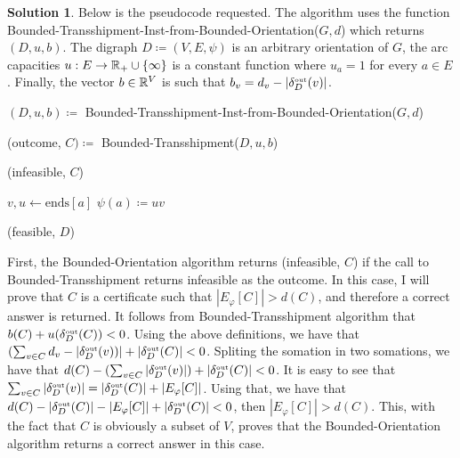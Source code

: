 \documentclass[11pt,leqno,final]{amsart}
\theoremstyle{definition}
\newtheorem{solution}{Solution}
\begin{document}
\begin{solution}
Below is the pseudocode requested. The algorithm uses the function Bounded-Transshipment-Inst-from-Bounded-Orientation($G,d$) which returns $(D, u, b)$. The digraph $D \coloneqq (V, E, \psi)$ is an arbitrary orientation of $G$, the arc capacities $u: E \to \Reals_{+} \cup \{\infty\}$ is a constant function where $u_a = 1$ for every $a \in E$. Finally, the vector $b \in \Reals^{V}$ is such that $b_v = d_v - |\deltaout[D](v)|$. 

\begin{algorithm}
  \caption{Bounded-Orientation($G$, $d$)}\label{bound}
  \begin{algorithmic}

    \State $(D, u, b) \coloneqq$ Bounded-Transshipment-Inst-from-Bounded-Orientation($G,d$)

    \State (outcome, $C) \coloneqq$ Bounded-Transshipment($D, u, b$)

              
      \State \Return (infeasible, $C$)  
    
    \EndIf 
    
      
        \State $v,u \gets \text{ends}[a]$        
        \State $\psi(a) \coloneqq uv$
      \EndIf 

    \EndFor
    \State \Return (feasible, $D$)
      
  \end{algorithmic}
\end{algorithm}

First, the Bounded-Orientation algorithm returns (infeasible, $C$) if the call to Bounded-Transshipment returns infeasible as the outcome. In this case, I will prove that $C$ is a certificate such that $|E_{\varphi} [C]| > d(C)$, and therefore a correct answer is returned. It follows from Bounded-Transshipment algorithm that $b(C) + u(\deltaout[D](C)) < 0$. Using the above definitions, we have that $(\sum_{v \in C} d_v - |\deltaout[D](v))| + |\deltaout[D](C)| < 0$. Spliting the somation in two somations, we have that  $d(C) - (\sum_{v \in C} |\deltaout[D](v)|) + |\deltaout[D](C)| < 0$. It is easy to see that $\sum_{v \in C} |\deltaout[D](v)| =  |\deltaout[D](C)| + |E_{\varphi}[C]|$. Using that, we have that $d(C) - |\deltaout[D](C)| - |E_{\varphi}[C]| + |\deltaout[D](C)| < 0$, then $|E_{\varphi} [C]| > d(C)$. This, with the fact that $C$ is obviously a subset of $V$, proves that the Bounded-Orientation algorithm returns a correct answer in this case.


\end{solution}
\end{document}
